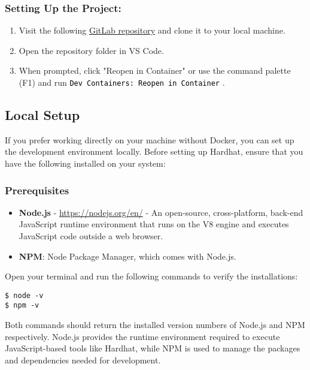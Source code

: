\documentclass[12pt]{article}
\newcommand{\codegrey}[1]{%
  \texttt{\colorbox{black!4}{\textcolor{black}{#1}}}%
}
\begin{document}
\subsubsection*{Setting Up the Project:}

\begin{enumerate}
  \item Visit the following \href{https://gitlab.fel.cvut.cz/radovluk/smart-contracts-exercises/-/tree/main/01-Hello-Blockchain-World/task/task-code}{GitLab repository} and clone it to your local machine.
  \item Open the repository folder in VS Code.
  \item When prompted, click "Reopen in Container" or use the command palette (F1) and run \codegrey{Dev Containers: Reopen in Container}.
\end{enumerate}

\subsection{Local Setup}

If you prefer working directly on your machine without Docker, you can set up the development environment locally. Before setting up Hardhat, ensure that you have the following installed on your system:

\subsubsection*{Prerequisites}
\begin{itemize}
    \item \textbf{Node.js} - \url{https://nodejs.org/en/} - An open-source, cross-platform, back-end JavaScript runtime environment that runs on the V8 engine and executes JavaScript code outside a web browser.
    \item \textbf{NPM}: Node Package Manager, which comes with Node.js.
\end{itemize}

\noindent
Open your terminal and run the following commands to verify the installations:

\begin{verbatim}
$ node -v
$ npm -v
\end{verbatim}

Both commands should return the installed version numbers of Node.js and NPM respectively. Node.js provides the runtime environment required to execute JavaScript-based tools like Hardhat, while NPM is used to manage the packages and dependencies needed for development.
\end{document}
